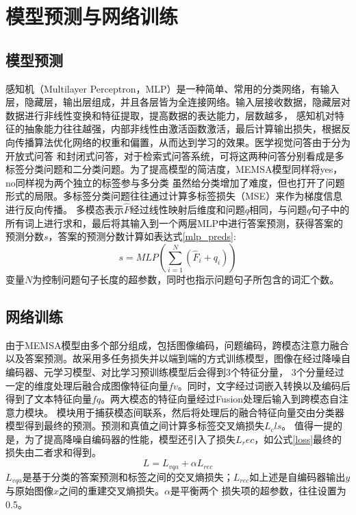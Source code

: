 \section{模型预测与网络训练}
\subsection{模型预测}
感知机（Multilayer Perceptron，MLP）是一种简单、常用的分类网络，有输入层，隐藏层，输出层组成，并且各层皆为全连接网络。输入层接收数据，隐藏层对数据进行非线性变换和特征提取，提高数据的表达能力，层数越多，
感知机对特征的抽象能力往往越强，内部非线性由激活函数激活，最后计算输出损失，根据反向传播算法优化网络的权重和偏置，从而达到学习的效果。医学视觉问答由于分为开放式问答
和封闭式问答，对于检索式问答系统，可将这两种问答分别看成是多标签分类问题和二分类问题。为了提高模型的简洁度，MEMSA模型同样将yes，no同样视为两个独立的标签参与多分类
虽然给分类增加了难度，但也打开了问题形式的局限。多标签分类问题往往通过计算多标签损失（MSE）来作为梯度信息进行反向传播。
多模态表示$\hat{F}$经过线性映射后维度和问题$q$相同，与问题$q$句子中的所有词上进行求和，最后将其输入到一个两层MLP中进行答案预测，获得答案的预测分数$s$，答案的预测分数计算如表达式\eqref{mlp_preds}:
\begin{equation}
	\label{mlp_preds}
	s=M L P\left(\sum_{i=1}^{N}\left(\hat{F}_i+q_i\right)\right) 
\end{equation}
变量$N$为控制问题句子长度的超参数，同时也指示问题句子所包含的词汇个数。

\subsection{网络训练}
由于MEMSA模型由多个部分组成，包括图像编码，问题编码，跨模态注意力融合以及答案预测。故采用多任务损失并以端到端的方式训练模型，图像在经过降噪自编码器、元学习模型、对比学习预训练模型后会得到3个特征分量，
3个分量经过一定的维度处理后融合成图像特征向量$fv$。同时，文字经过词嵌入转换以及编码后得到了文本特征向量$fq$。两大模态的特征向量经过Fusion处理后输入到跨模态自注意力模块。
模块用于捕获模态间联系，然后将处理后的融合特征向量交由分类器模型得到最终的预测。预测和真值之间计算多标签交叉熵损失$L_cls$。
值得一提的是，为了提高降噪自编码器的性能，模型还引入了损失$L_rec$，如公式\eqref{loss}最终的损失由二者求和得到。
\begin{equation}
	\label{loss}
	L=L_{vqa}+\alpha L_{rec} 
\end{equation}
$L_{vqa}$是基于分类的答案预测和标签之间的交叉熵损失；$L_{rec}$如上述是自编码器输出$y$与原始图像$x$之间的重建交叉熵损失。$\alpha$是平衡两个
损失项的超参数，往往设置为0.5。

